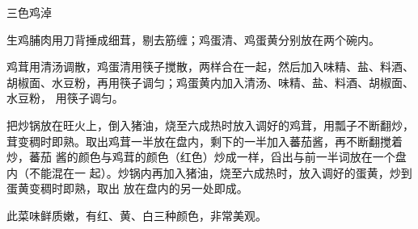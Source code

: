 %
%
%
%
%
%
%
\begin{recipe}{三色鸡淖}

\ingredients


\preparation

\step 生鸡脯肉用刀背捶成细茸，剔去筋缠；鸡蛋清、鸡蛋黄分别放在两个碗内。

\step 鸡茸用清汤调散，鸡蛋清用筷子搅散，两样合在一起，然后加入味精、盐、料酒、
胡椒面、水豆粉，再用筷子调匀；鸡蛋黄内加入清汤、味精、盐、料酒、胡椒面、水豆粉，
用筷子调匀。

\step 把炒锅放在旺火上，倒入猪油，烧至六成热时放入调好的鸡茸，用瓢子不断翻炒，
茸变稠时即熟。取出鸡茸一半放在盘内，剩下的一半加入蕃茄酱，再不断翻搅着炒，蕃茄
酱的颜色与鸡茸的颜色（红色）炒成一样，舀出与前一半词放在一个盘内（不能混在一
起）。炒锅内再加入猪油，烧至六成热时，放入调好的蛋黄，炒到蛋黄变稠时即熟，取出
放在盘内的另一处即成。

\features

此菜味鲜质嫩，有红、黄、白三种颜色，非常美观。

\end{recipe}

